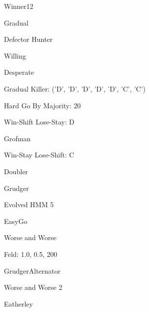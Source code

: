 \item Winner12
\item Gradual
\item Defector Hunter
\item Willing
\item Desperate
\item Gradual Killer: ('D', 'D', 'D', 'D', 'D', 'C', 'C')
\item Hard Go By Majority: 20
\item Win-Shift Lose-Stay: D
\item Grofman
\item Win-Stay Lose-Shift: C
\item Doubler
\item Grudger
\item Evolved HMM 5
\item EasyGo
\item Worse and Worse
\item Feld: 1.0, 0.5, 200
\item GrudgerAlternator
\item Worse and Worse 2
\item Eatherley
